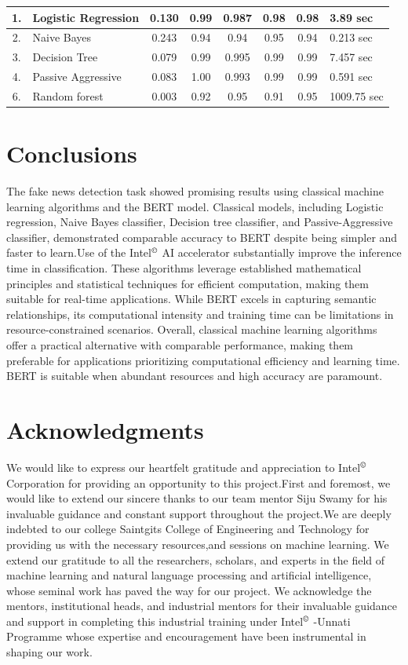 \documentclass{josis}
\begin{document}
{\begin{table}
\begin{tabular}{|c|l|c|c|c|c|c|l|}
1. & Logistic Regression & 0.130 & 0.99 & 0.987 & 0.98 & 0.98 & 3.89 sec \\ \hline
2. & Naive Bayes & 0.243 & 0.94 & 0.94 & 0.95 & 0.94 & 0.213 sec \\ \hline
3. & Decision Tree& 0.079 & 0.99 & 0.995 & 0.99 & 0.99 & 7.457 sec \\ \hline
4. & Passive Aggressive & 0.083 & 1.00 & 0.993 & 0.99 & 0.99 & 0.591 sec \\ \hline
6.& Random forest    &0.003 &0.92 &0.95 &0.91 &0.95 &1009.75 sec\\ \hline
\end{tabular}
\end{table}
\section{Conclusions}
The fake news detection task showed promising results using classical machine learning algorithms and the BERT model. Classical models, including Logistic regression, Naive Bayes classifier, Decision tree classifier, and Passive-Aggressive classifier, demonstrated comparable accuracy to BERT despite being simpler and faster to learn.Use of the Intel$^\copyright$ AI accelerator substantially improve the inference time in classification. These algorithms leverage established mathematical principles and statistical techniques for efficient computation, making them suitable for real-time applications. While BERT excels in capturing semantic relationships, its computational intensity and training time can be limitations in resource-constrained scenarios. Overall, classical machine learning algorithms offer a practical alternative with comparable performance, making them preferable for applications prioritizing computational efficiency and learning time. BERT is suitable when abundant resources and high accuracy are paramount.
\section*{Acknowledgments}
We would like to express our heartfelt gratitude and appreciation to Intel$^\copyright$ Corporation for providing an opportunity to this project.First and foremost, we would like to extend our sincere thanks to our team mentor Siju Swamy for his invaluable guidance and constant support throughout the project.We are deeply indebted to our college Saintgits College of Engineering and Technology for providing us with the necessary resources,and sessions on machine learning. We extend our gratitude to all the researchers, scholars, and experts in the field of machine learning and natural language processing and artificial intelligence, whose seminal work has paved the way for our project. We acknowledge the mentors, institutional heads, and industrial mentors for their invaluable guidance and support in completing this industrial training under Intel$^\copyright$ -Unnati Programme whose expertise and encouragement have been instrumental in shaping our work.
\cite{*}


\appendix
}
\end{document}
